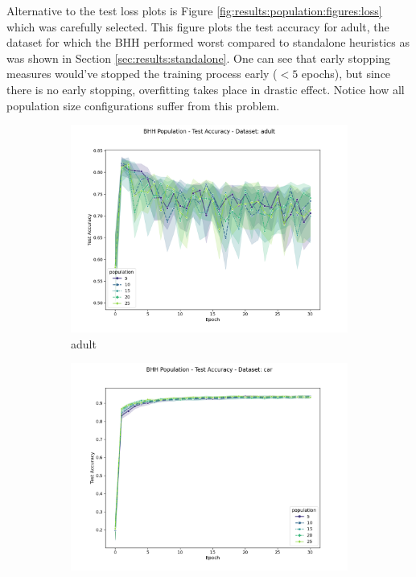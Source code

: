  Alternative to the test loss plots is Figure \ref{fig:results:population:figures:loss} which was carefully selected. This figure plots the test accuracy for adult, the dataset for which the \Ac{BHH} performed worst compared to standalone heuristics as was shown in Section \ref{sec:results:standalone}. One can see that early stopping measures would've stopped the training process early ($< 5$ epochs), but since there is no early stopping, overfitting takes place in drastic effect. Notice how all population size configurations suffer from this problem. 
 
\begin{figure}[htbp]
	\begin{subfigure}{0.5\textwidth}
    	\centering
        \includegraphics[width=\textwidth]{analysis/bhh_population/figures/test/accuracy/adult.png}
        \caption{adult}
        \label{fig:results:population:figures:accuracy1}
	\end{subfigure}
	\begin{subfigure}{0.5\textwidth}
    	\centering
        \includegraphics[width=\textwidth]{analysis/bhh_population/figures/test/accuracy/car.png}

\end{subfigure}
\end{figure}
